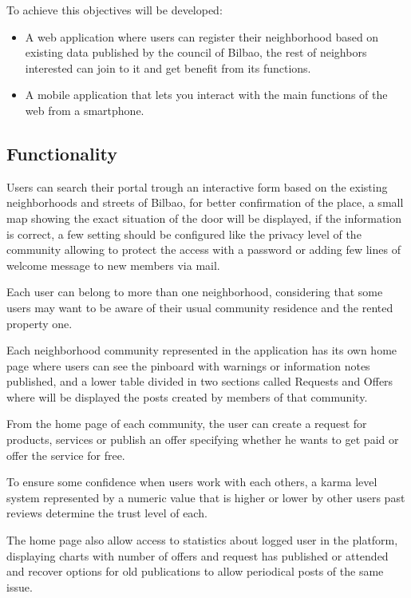 \documentclass{DeustoFDP}
\begin{document}
To achieve this objectives will be developed:
\begin{itemize}
	\item A web application where users can register their neighborhood based on existing data published by the council of Bilbao, the rest of neighbors interested can join to it and get benefit from its functions.
	
	\item A mobile application that lets you interact with the main functions of the web from a smartphone.
\end{itemize}

\subsection{Functionality}
Users can search their portal trough an interactive form based on the existing neighborhoods and streets of Bilbao, for better confirmation of the place, a small map showing the exact situation of the door will be displayed, if the information is correct, a few setting should be configured like the privacy level of the community allowing to protect the access with a password or adding few lines of welcome message to new members via mail.

Each user can belong to more than one neighborhood, considering that some users may want to be aware of their usual community residence and the rented property one.

Each neighborhood community represented in the application has its own home page where users can see the pinboard with warnings or information notes published, and a lower table divided in two sections called Requests and Offers where will be displayed the posts created by members of that community.

From the home page of each community, the user can create a request for products, services or publish an offer specifying whether he wants to get paid or offer the service for free.

To ensure some confidence when users work with each others, a karma level system represented by a numeric value that is higher or lower by other users past reviews determine the trust level of each.

The home page  also allow access to statistics about logged user in the platform, displaying charts with number of offers and request has published or attended and recover options for old publications to allow periodical posts of the same issue.
\end{document}

